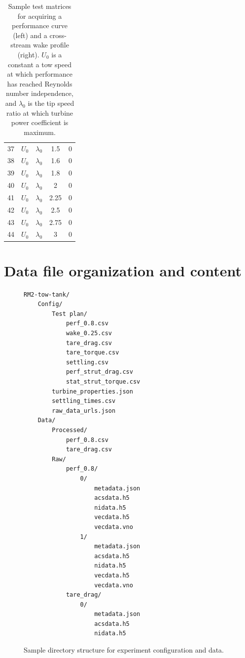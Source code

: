 \documentclass[12pt,letterpaper]{scrreprt}
\begin{document}
\begin{appendices}
\begin{table}[!ht]
{\begin{tabular}{c|c|c|c|c}
37  & $U_0$        & $\lambda_0$ & 1.5   & 0   \\
38  & $U_0$        & $\lambda_0$ & 1.6   & 0   \\
39  & $U_0$        & $\lambda_0$ & 1.8   & 0   \\
40  & $U_0$        & $\lambda_0$ & 2     & 0   \\
41  & $U_0$        & $\lambda_0$ & 2.25  & 0   \\
42  & $U_0$        & $\lambda_0$ & 2.5   & 0   \\
43  & $U_0$        & $\lambda_0$ & 2.75  & 0   \\
44  & $U_0$        & $\lambda_0$ & 3     & 0  
\end{tabular}}
\caption{Sample test matrices for acquiring a performance curve (left) and a
cross-stream wake profile (right). $U_0$ is a constant a tow speed at which
performance has reached Reynolds number independence, and $\lambda_0$ is the tip
speed ratio at which turbine power coefficient is maximum.}
\label{tab-test_section}
\end{table}


\chapter{Data file organization and content}

\begin{figure}
\begin{verbatim}
RM2-tow-tank/
    Config/
        Test plan/
            perf_0.8.csv
            wake_0.25.csv
            tare_drag.csv
            tare_torque.csv
            settling.csv
            perf_strut_drag.csv
            stat_strut_torque.csv
        turbine_properties.json
        settling_times.csv
        raw_data_urls.json
    Data/
        Processed/
            perf_0.8.csv
            tare_drag.csv
        Raw/
            perf_0.8/
                0/
                    metadata.json
                    acsdata.h5
                    nidata.h5
                    vecdata.h5
                    vecdata.vno
                1/    
                    metadata.json
                    acsdata.h5
                    nidata.h5
                    vecdata.h5
                    vecdata.vno
            tare_drag/
                0/
                    metadata.json
                    acsdata.h5
                    nidata.h5
\end{verbatim}
\caption{Sample directory structure for experiment configuration and data.}
\label{fig-dir_structure}
\end{figure}


\end{appendices}
\end{document}
